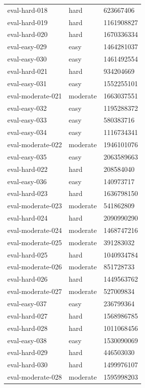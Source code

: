 \begin{tabular}{lll}
eval-hard-018 & hard & 623667406 \\
eval-hard-019 & hard & 1161908827 \\
eval-hard-020 & hard & 1670336334 \\
eval-easy-029 & easy & 1464281037 \\
eval-easy-030 & easy & 1461492554 \\
eval-hard-021 & hard & 934204669 \\
eval-easy-031 & easy & 1552255101 \\
eval-moderate-021 & moderate & 1663037551 \\
eval-easy-032 & easy & 1195288372 \\
eval-easy-033 & easy & 580383716 \\
eval-easy-034 & easy & 1116734341 \\
eval-moderate-022 & moderate & 1946101076 \\
eval-easy-035 & easy & 2063589663 \\
eval-hard-022 & hard & 208584040 \\
eval-easy-036 & easy & 140973717 \\
eval-hard-023 & hard & 1636798150 \\
eval-moderate-023 & moderate & 541862809 \\
eval-hard-024 & hard & 2090990290 \\
eval-moderate-024 & moderate & 1468747216 \\
eval-moderate-025 & moderate & 391283032 \\
eval-hard-025 & hard & 1040934784 \\
eval-moderate-026 & moderate & 851728733 \\
eval-hard-026 & hard & 1449563762 \\
eval-moderate-027 & moderate & 527009834 \\
eval-easy-037 & easy & 236799364 \\
eval-hard-027 & hard & 1568986785 \\
eval-hard-028 & hard & 1011068456 \\
eval-easy-038 & easy & 1530090069 \\
eval-hard-029 & hard & 446503030 \\
eval-hard-030 & hard & 1499976107 \\
eval-moderate-028 & moderate & 1595998203 \\
\hline
\end{tabular}
